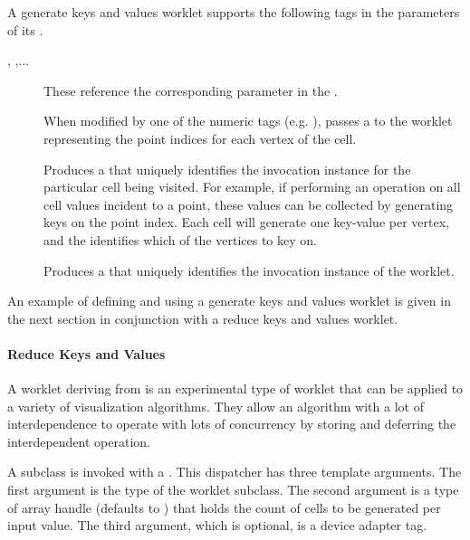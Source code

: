 A generate keys and values worklet supports the following tags in the
parameters of its \executionsignature.
\begin{description}
\item[, ,$\ldots$] These reference the
  corresponding parameter in the \controlsignature.
\item[] When modified by one of the numeric tags
  (e.g. ), passes a  to the
  worklet representing the point indices for each vertex of the cell.
\item[] Produces a  that uniquely identifies the
  invocation instance for the particular cell being visited. For example,
  if performing an operation on all cell values incident to a point, these
  values can be collected by generating keys on the point index. Each cell
  will generate one key-value per vertex, and the 
  identifies which of the vertices to key on.
\item[] Produces a  that uniquely identifies the
  invocation instance of the worklet.
\end{description}

An example of defining and using a generate keys and values worklet is
given in the next section in conjunction with a reduce keys and values
worklet.


\paragraph{Reduce Keys and Values}


A worklet deriving from  is an
experimental type of worklet that can be applied to a variety of
visualization algorithms. They allow an algorithm with a lot of
interdependence to operate with lots of concurrency by storing and
deferring the interdependent operation.

A  subclass is invoked with a
. This dispatcher has three template
arguments. The first argument is the type of the worklet subclass. The
second argument is a type of array handle (defaults to
\textcode{<}\textcode{>}) that holds the count
of cells to be generated per input value. The third argument, which is
optional, is a device adapter tag.

